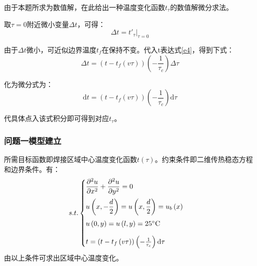 \documentclass[a4paper,12pt]{ctexart} %
\begin{document}
	由于本题所求为数值解，在此给出一种温度变化函数$t_{\tau}$的数值解微分求法。\par 取$\tau=0$附近微小变量$\varDelta t$，可得：
	\begin{equation}
	\varDelta t=t'_{\tau}\bigg|_{\tau=0}
	\end{equation}\par
	由于$\varDelta t$微小，可近似边界温度$t_f$在保持不变。代入t表达式\ref{e4}，得到下式：
	\begin{equation}
	\varDelta t=\left(t-t_f\left(v\tau\right)\right)\left(-\frac{1}{\tau_c}\right)\varDelta\tau
	\end{equation}\par
	化为微分式为：
	\begin{equation}
	\mathrm{d} t=\left(t-t_f\left(v\tau\right)\right)\left(-\frac{1}{\tau_c}\right)\mathrm{d}\tau
	\end{equation}\par
	代具体点入该式积分即可得到对应$t_{\tau}$。
	\subsubsection{问题一模型建立}
	所需目标函数即焊接区域中心温度变化函数$t\left(\tau\right)$。约束条件即二维传热稳态方程和边界条件。有：
	\begin{equation}
	s.t.\begin{cases}
	\dfrac{\partial^2 u}{\partial x^2}+\dfrac{\partial^2 u}{\partial y^2}=0\\[1em]
	u\left(x,-\dfrac{d}{2}\right)=u\left(x,\dfrac{d}{2}\right)=u_b\left(x\right)\\[1em]
	u\left(0,y\right)=u\left(l,y\right)=25\degree\mathrm C\\[1em]
	t=\left(t-t_f\left(v\tau\right)\right)\left(-\frac{1}{\tau_c}\right)\mathrm{d}\tau\\
	\end{cases}
	\end{equation}
	由以上条件可求出区域中心温度变化。\par
	
\end{document}
